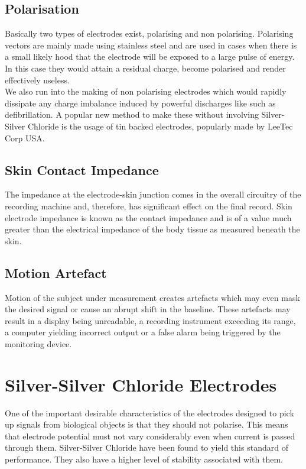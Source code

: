 \documentclass{article}
\begin{document}
\subsection{Polarisation}
Basically two types of electrodes exist, polarising and non polarising. Polarising vectors are mainly made using stainless steel and are used in cases when there is a small likely hood that the electrode will be exposed to a large pulse of energy. In this case they would attain a residual charge, become polarised and render effectively useless.\\
We also run into the making of non polarising electrodes which would rapidly dissipate any charge imbalance induced by powerful discharges like such as defibrillation. A popular new method to make these without involving Silver-Silver Chloride is the usage of tin backed electrodes, popularly made by LeeTec Corp USA.
\subsection{Skin Contact Impedance}
The impedance at the electrode-skin junction comes in the overall circuitry of the recording machine and, therefore, has significant effect on the final record. Skin electrode impedance is known as the contact impedance and is of a value much greater than the electrical impedance of the body tissue as measured beneath the skin. 
\subsection{Motion Artefact}
 Motion of the subject under measurement creates artefacts which may even mask the desired signal or cause an abrupt shift in the baseline. These artefacts may result in a display being unreadable, a recording instrument exceeding its range, a computer yielding incorrect output or a false alarm being triggered by the monitoring device. 
\section{Silver-Silver Chloride Electrodes}
One of the important desirable characteristics of the electrodes designed to pick up signals from biological objects is that they should not polarise. This means that electrode potential must not vary considerably even when current is passed through them. Silver-Silver Chloride have been found to yield this standard of performance. They also have a higher level of stability associated with them.
\end{document}
